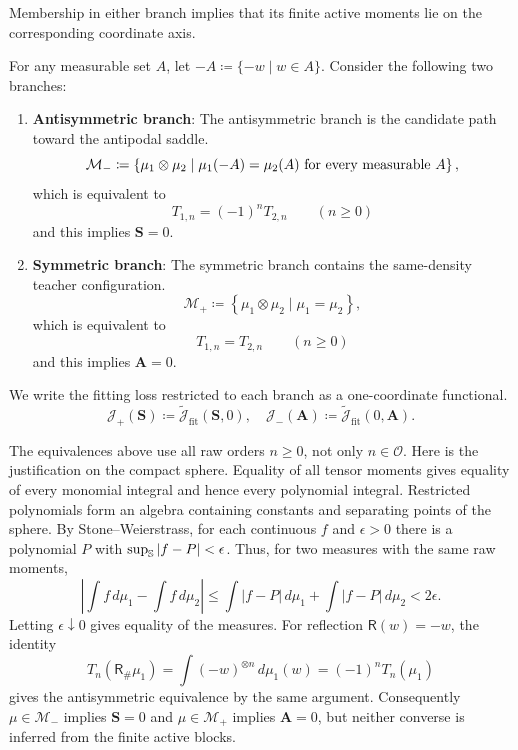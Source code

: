 Membership in either branch implies that its finite active moments lie
on the corresponding coordinate axis.
\begin{definition}
For any measurable set $A$, let $-A \coloneq \{-w \mid w\in A\}$.
Consider the following two branches:
\begin{enumerate}
\item \textbf{Antisymmetric branch}: The antisymmetric branch is the candidate path toward the antipodal saddle.
\begin{equation}
    \mathcal{M}_{-}
    \coloneq
    \left\{
        \mu_1\otimes \mu_2
        \mid
        \mu_1(-A)=\mu_2(A)
        \text{ for every measurable }A
    \right\},
\end{equation}
which is equivalent to
\begin{equation}
    T_{1,n}=(-1)^nT_{2,n}
    \qquad
    (n\ge 0)
\end{equation}
and this implies $\mathbf S=0$.
\item \textbf{Symmetric branch}: The symmetric branch contains the same-density teacher configuration.
\begin{equation}
    \mathcal M_+
    \coloneq
    \left\{
        \mu_1\otimes \mu_2
        \mid
        \mu_1=\mu_2
    \right\},
\end{equation}
which is equivalent to
\begin{equation}
    T_{1,n}=T_{2,n}
    \qquad
    (n\ge 0)
\end{equation}
and this implies $\mathbf A=0$.
\end{enumerate}

We write the fitting loss restricted to each branch as a one-coordinate functional.
\begin{equation}
\label{eq:branch-reduced-functional-Mplus-block-v3}
    \mathcal J_+(\mathbf S)
    \coloneq
    \widetilde{\mathcal J}_{\mathrm{fit}}(\mathbf S,0),
    \quad 
    \mathcal J_-(\mathbf A)
    \coloneq
    \widetilde{\mathcal J}_{\mathrm{fit}}(0,\mathbf A).
\end{equation}
\end{definition}

The equivalences above use all raw orders $n\ge0$, not only
$n\in\mathcal O$. Here is the justification on the compact sphere.
Equality of all tensor moments gives equality of every monomial integral
and hence every polynomial integral. Restricted polynomials form an
algebra containing constants and separating points of the sphere.
By Stone--Weierstrass, for each continuous $f$ and $\epsilon>0$
there is a polynomial $P$ with $\sup_{\mathbb{S}}|f-P|<\epsilon$. Thus,
for two measures with the same raw moments,
\[
 \left|\int f\,d\mu_1-\int f\,d\mu_2\right|
 \le\int|f-P|\,d\mu_1+\int|f-P|\,d\mu_2<2\epsilon.
\]
Letting $\epsilon\downarrow0$ gives equality of the measures.
For reflection $\mathsf R(w)=-w$, the identity
\[
 T_n(\mathsf R_\#\mu_1)
 =\int(-w)^{\otimes n}\,d\mu_1(w)=(-1)^nT_n(\mu_1)
\]
gives the antisymmetric equivalence by the same argument.
Consequently $\mu\in\mathcal M_-$ implies $\mathbf S=0$ and
$\mu\in\mathcal M_+$ implies $\mathbf A=0$, but neither converse is
inferred from the finite active blocks.


